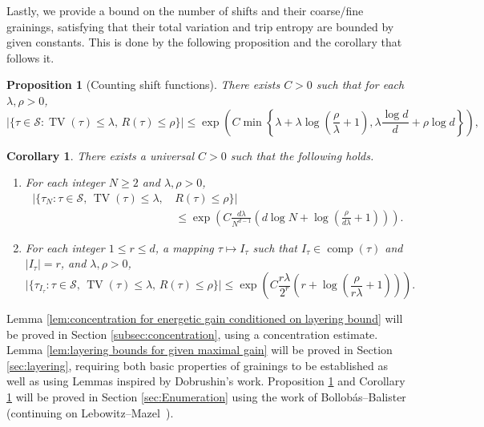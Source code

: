 \documentclass[11pt, reqno]{amsart}
\newtheorem{proposition}[theorem]{Proposition}
\newtheorem{corollary}[theorem]{Corollary}
\DeclareMathOperator{\TV}{TV}
\DeclareMathOperator{\comp}{comp}
\numberwithin{equation}{section}
\begin{document}
Lastly, we provide a bound on the number of shifts and their coarse/fine grainings, satisfying that their total variation and trip entropy are bounded by given constants. This is done by the following proposition and the corollary that follows it.

\begin{proposition}[Counting shift functions]\label{prop:enumerate_shift_functions} There exists $C>0$ such that for each $\lambda,\rho>0$,
\begin{equation*}
\lvert\{\tau\in{\mathcal S}\colon \TV(\tau) \leq \lambda,\, R(\tau) \leq \rho\}\rvert\leq
\exp\left(C\min\left\{\lambda+\lambda\log\left(\frac{\rho}{\lambda}+1\right), \lambda\frac{\log d}{d}+\rho\log d\right\}\right),
\end{equation*}
\end{proposition}

\begin{corollary}\label{cor:enumerate_grainings_shift_functions}
There exists a universal $C>0$ such that the following holds.
\begin{enumerate}
\item 
For each integer $N\geq 2$ and $\lambda,\rho>0$,
\begin{align}
\label{eq:coarse_enumerate_shift_functions}
\lvert \{\tau_{N}\colon\tau\in{\mathcal S},\,\TV(\tau) \leq \lambda,\, &R(\tau)\leq   \rho \} \rvert \nonumber\\
&\leq \exp\left(C\frac{d\lambda}{N^{d-1}}  \left(d\log N +\log\left(\frac{\rho}{d\lambda}+1 \right)\right)\right).
\end{align}
\item 
For each integer $1\le r\le d$, a mapping $\tau \mapsto I_{\tau}$ such that $I_{\tau}\in \comp(\tau)$ and $|I_{\tau}|=r$, and $\lambda,\rho>0$,
\begin{equation}
\lvert\{\tau_{I_\tau}\colon \tau\in{\mathcal S},\,\TV(\tau) \leq \lambda,\, R(\tau)\leq  \rho\}\rvert\leq \exp\left( C\frac{r \lambda}{2^{r}}\left(r+\log\left(\frac{\rho}{r\lambda}+1\right)\right)\right). \label{eq:fine_enumerate_shift_functions}
\end{equation}
\end{enumerate}
\end{corollary}

Lemma \ref{lem:concentration for energetic gain conditioned on layering bound} will be proved in Section \ref{subsec:concentration}, using a concentration estimate.
Lemma \ref{lem:layering bounds for given maximal gain} will be proved in Section \ref{sec:layering}, requiring both basic properties of grainings to be established as well as using Lemmas inspired by Dobrushin's work. Proposition \ref{prop:enumerate_shift_functions} and  Corollary \ref{cor:enumerate_grainings_shift_functions} will be proved in Section \ref{sec:Enumeration} using the work of Bollob\'as--Balister \cite{BB} (continuing on  Lebowitz--Mazel~\cite{LM}).
\end{document}
